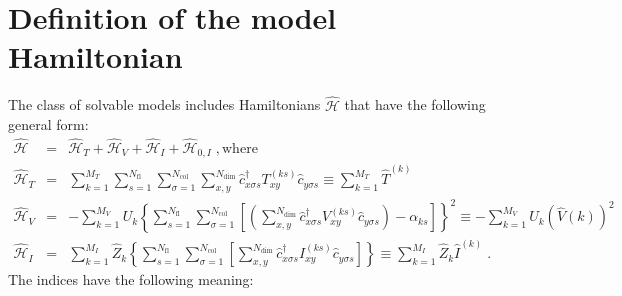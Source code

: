 \section{Definition of the model Hamiltonian}\label{sec:def}


 
The class of solvable models includes  Hamiltonians $\hat{\mathcal{H}}$ that have the following general form:
\begin{eqnarray}
\hat{\mathcal{H}}&=&\hat{\mathcal{H}}_{T}+\hat{\mathcal{H}}_{V} +  \hat{\mathcal{H}}_{I} +   \hat{\mathcal{H}}_{0,I}\;,\mathrm{where}
\label{eqn:general_ham}\\
\hat{\mathcal{H}}_{T}
&=&
\sum\limits_{k=1}^{M_T}
\sum\limits_{s=1}^{N_{\mathrm{fl}}}
\sum\limits_{\sigma=1}^{N_{\mathrm{col}}}
\sum\limits_{x,y}^{N_{\mathrm{dim}}}
\hat{c}^{\dagger}_{x \sigma   s}T_{xy}^{(k s)} \hat{c}^{\phantom\dagger}_{y \sigma s}  \equiv  \sum\limits_{k=1}^{M_T} \hat{T}^{(k)}
\label{eqn:general_ham_t}\\
\hat{\mathcal{H}}_{V}
&=&
-
\sum\limits_{k=1}^{M_V}U_{k}
\left\{
\sum\limits_{s=1}^{N_{\mathrm{fl}}}
\sum\limits_{\sigma=1}^{N_{\mathrm{col}}}
\left[
\left(
\sum\limits_{x,y}^{N_{\mathrm{dim}}}
\hat{c}^{\dagger}_{x \sigma s}V_{xy}^{(k s)}\hat{c}^{\phantom\dagger}_{y \sigma s}
\right)
-\alpha_{k s} 
\right]
\right\}^{2}  \equiv   -
\sum\limits_{k=1}^{M_V}U_{k}   \left(\hat{V}{(k)} \right)^2
\label{eqn:general_ham_v}\\
\hat{\mathcal{H}}_{I}  & = &
\sum\limits_{k=1}^{M_I} \hat{Z}_{k} 
\left\{
\sum\limits_{s=1}^{N_{\mathrm{fl}}}
\sum\limits_{\sigma=1}^{N_{\mathrm{col}}}
\left[
\sum\limits_{x,y}^{N_{\mathrm{dim}}}
\hat{c}^{\dagger}_{x \sigma s} I_{xy}^{(k s)}\hat{c}^{\phantom\dagger}_{y \sigma s}
\right]
\right\} \equiv \sum\limits_{k=1}^{M_I} \hat{Z}_{k}    \hat{I}^{(k)} 
\;.\label{eqn:general_ham_i}
\end{eqnarray}
The indices have the following meaning:
